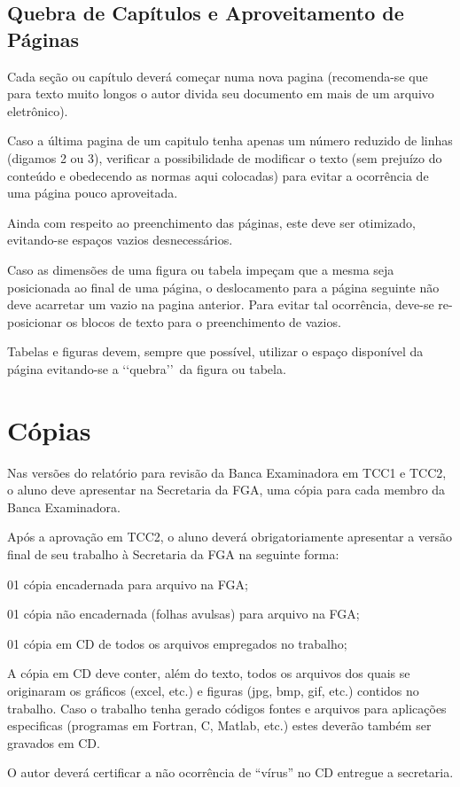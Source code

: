 \subsection{Quebra de Capítulos e Aproveitamento de Páginas}

Cada seção ou capítulo deverá começar numa nova pagina (recomenda-se que 
para texto muito longos o autor divida seu documento em mais de um arquivo 
eletrônico). 

Caso a última pagina de um capitulo tenha apenas um número reduzido de 
linhas (digamos 2 ou 3), verificar a possibilidade de modificar o texto 
(sem prejuízo do conteúdo e obedecendo as normas aqui colocadas) para 
evitar a ocorrência de uma página pouco aproveitada.

Ainda com respeito ao preenchimento das páginas, este deve ser otimizado, 
evitando-se espaços vazios desnecessários. 

Caso as dimensões de uma figura ou tabela impeçam que a mesma seja 
posicionada ao final de uma página, o deslocamento para a página seguinte 
não deve acarretar um vazio na pagina anterior. Para evitar tal ocorrência, 
deve-se re-posicionar os blocos de texto para o preenchimento de vazios. 

Tabelas e figuras devem, sempre que possível, utilizar o espaço disponível 
da página evitando-se a \lq\lq quebra\rq\rq\ da figura ou tabela. 

\section{Cópias}

Nas versões do relatório para revisão da Banca Examinadora em TCC1 e TCC2, 
o aluno deve apresentar na Secretaria da FGA, uma cópia para cada membro da 
Banca Examinadora.

Após a aprovação em TCC2, o aluno deverá obrigatoriamente apresentar a 
versão final de seu trabalho à Secretaria da FGA na seguinte forma:

\begin{description}
	\item 01 cópia encadernada para arquivo na FGA;
	\item 01 cópia não encadernada (folhas avulsas) para arquivo na FGA;
	\item 01 cópia em CD de todos os arquivos empregados no trabalho;
\end{description}

A cópia em CD deve conter, além do texto, todos os arquivos dos quais se 
originaram os gráficos (excel, etc.) e figuras (jpg, bmp, gif, etc.) 
contidos no trabalho. Caso o trabalho tenha gerado códigos fontes e 
arquivos para aplicações especificas (programas em Fortran, C, Matlab, 
etc.) estes deverão também ser gravados em CD. 

O autor deverá certificar a não ocorrência de “vírus” no CD entregue a 
secretaria. 

